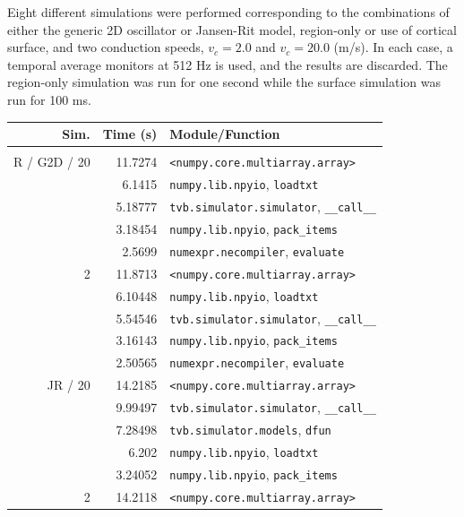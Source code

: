 \documentclass{bioinfo}
\begin{document}
	Eight different simulations were performed corresponding to the combinations of
	either the generic 2D oscillator or Jansen-Rit model, region-only
	or use of cortical surface, and two conduction speeds, $v_c = 2.0$ and
	$v_c = 20.0$ (m/s). In each case, a temporal average monitors at 512 Hz
	is used, and the results are discarded. The region-only simulation was
	run for one second while the surface simulation was run for 100 ms. 

		\begin{table}
		{\footnotesize \begin{tabular}{r | r | l }
		Sim. &        Time (s) &                     Module/Function \\
		\hline \\
		R / G2D / 20  &         11.7274 & \texttt{<numpy.core.multiarray.array>} \\
		&          6.1415 & \texttt{numpy.lib.npyio}, \texttt{loadtxt} \\
		 &         5.18777 & \texttt{tvb.simulator.simulator}, \texttt{\_\_call\_\_} \\
		 &         3.18454 & \texttt{numpy.lib.npyio}, \texttt{pack\_items} \\
		 &          2.5699 & \texttt{numexpr.necompiler}, \texttt{evaluate} \\
		\hline
		2 &         11.8713 & \texttt{<numpy.core.multiarray.array>} \\
		&         6.10448 & \texttt{numpy.lib.npyio}, \texttt{loadtxt} \\
		 &         5.54546 & \texttt{tvb.simulator.simulator}, \texttt{\_\_call\_\_} \\
		 &         3.16143 & \texttt{numpy.lib.npyio}, \texttt{pack\_items} \\
		 &         2.50565 & \texttt{numexpr.necompiler}, \texttt{evaluate} \\
		\hline
		 JR / 20  &         14.2185 & \texttt{<numpy.core.multiarray.array>} \\
		&         9.99497 & \texttt{tvb.simulator.simulator}, \texttt{\_\_call\_\_} \\
		 &         7.28498 & \texttt{tvb.simulator.models}, \texttt{dfun} \\
		 &           6.202 & \texttt{numpy.lib.npyio}, \texttt{loadtxt} \\
		 &         3.24052 & \texttt{numpy.lib.npyio}, \texttt{pack\_items} \\
		\hline
		2 &         14.2118 & \texttt{<numpy.core.multiarray.array>} \\

\end{tabular}}
\end{table}
\end{document}
